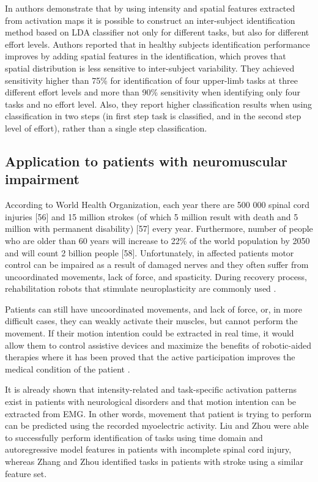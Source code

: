 In \citep{Rojas-Martinez2013} authors demonstrate that by using intensity and spatial features extracted from activation maps it is possible to construct an inter-subject identification method based on LDA classifier not only for different tasks, but also for different effort levels. Authors reported that in healthy subjects identification performance improves by adding spatial features in the identification, which proves that spatial distribution is less sensitive to inter-subject variability. They achieved sensitivity higher than 75\% for identification of four upper-limb tasks at three different effort levels and more than 90\% sensitivity when identifying only four tasks and no effort level. Also, they report higher classification results when using classification in two steps (in first step task is classified, and in the second step level of effort), rather than a single step classification.



\subsection{Application to patients with neuromuscular impairment}
According to World Health Organization, each year there are 500 000 spinal cord injuries [56] and 15 million strokes (of which 5 million result with death and 5 million with permanent disability) [57] every year. Furthermore, number of people who are older than 60 years will increase to 22\% of the world population by 2050 and will count 2 billion people [58]. Unfortunately, in affected patients motor control can be impaired as a result of damaged nerves and they often suffer from uncoordinated movements, lack of force, and spasticity. During recovery process, rehabilitation robots that stimulate neuroplasticity are commonly used \citep{VacaBenitez2013, Dipietro2005, Marchal-Crespo2009}. 

Patients can still have uncoordinated movements, and lack of force, or, in more difficult cases, they can weakly activate their muscles, but cannot perform the movement. If their motion intention could be extracted in real time, it would allow them to control assistive devices and maximize the benefits of robotic-aided therapies where it has been proved that the active participation improves the medical condition of the patient \citep{Hogan2006}.

It is already shown that intensity-related and task-specific activation patterns exist in patients with neurological disorders and that motion intention can be extracted from EMG. In other words, movement that patient is trying to perform can be predicted using the recorded myoelectric activity. Liu and Zhou \citep{Liu2013} were able to successfully perform identification of tasks using time domain and autoregressive model features in patients with incomplete spinal cord injury, whereas Zhang and Zhou \citep{Zhang2012} identified tasks in patients with stroke using a similar feature set.





